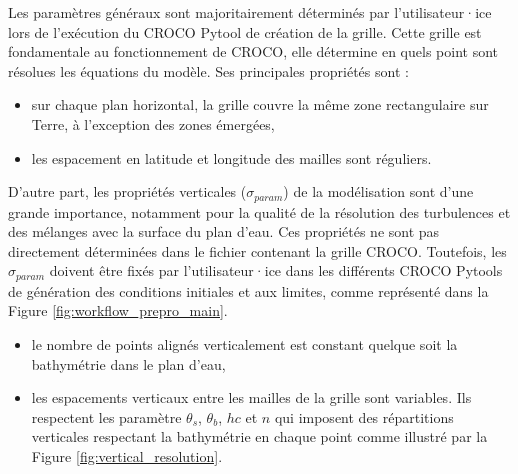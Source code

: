 \documentclass[10pt,a4paper,titlepage]{article}
\begin{document}
Les paramètres généraux sont majoritairement déterminés par l'utilisateur·ice lors de l'exécution du CROCO Pytool de création de la grille.
Cette grille est fondamentale au fonctionnement de CROCO, elle détermine en quels point sont résolues les équations du modèle. Ses principales propriétés sont :

\begin{itemize}
    \item sur chaque plan horizontal, la grille couvre la même zone rectangulaire sur Terre, à l'exception des zones émergées,
    \item les espacement en latitude et longitude des mailles sont réguliers.
\end{itemize}

D'autre part, les propriétés verticales ($\sigma_{param}$) de la modélisation sont d'une grande importance, notamment pour la qualité de la résolution des turbulences et des mélanges avec la surface du plan d'eau.
Ces propriétés ne sont pas directement déterminées dans le fichier contenant la grille CROCO.
Toutefois, les $\sigma_{param}$ doivent être fixés par l'utilisateur·ice dans les différents CROCO Pytools de génération des conditions initiales et aux limites, comme représenté dans la Figure \ref{fig:workflow_prepro_main}.

\begin{itemize}
    \item le nombre de points alignés verticalement est constant quelque soit la bathymétrie dans le plan d'eau,
    \item les espacements verticaux entre les mailles de la grille sont variables. Ils respectent les paramètre $\theta_s$, $\theta_b$, $hc$ et $n$ qui imposent des répartitions verticales respectant la bathymétrie en chaque point comme illustré par la Figure \ref{fig:vertical_resolution}.
\end{itemize}
\end{document}
